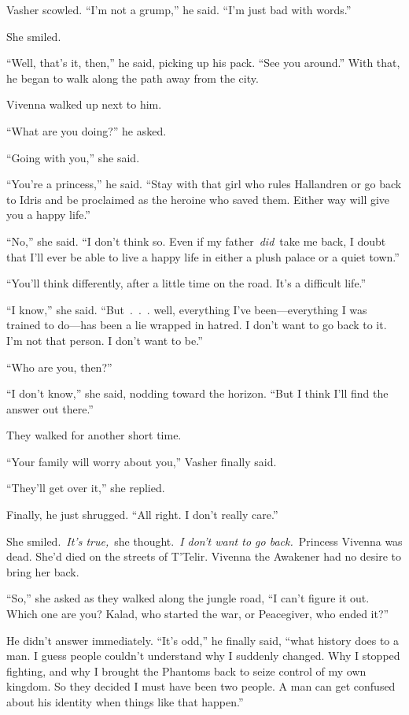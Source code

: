 Vasher scowled. “I’m not a grump,” he said. “I’m just bad with words.”

She smiled.

“Well, that’s it, then,” he said, picking up his pack. “See you around.” With that, he began to walk along the path away from the city.

Vivenna walked up next to him.

“What are you doing?” he asked.

“Going with you,” she said.

“You’re a princess,” he said. “Stay with that girl who rules Hallandren or go back to Idris and be proclaimed as the heroine who saved them. Either way will give you a happy life.”

“No,” she said. “I don’t think so. Even if my father~\textit{did}~take me back, I doubt that I’ll ever be able to live a happy life in either a plush palace or a quiet town.”

“You’ll think differently, after a little time on the road. It’s a difficult life.”

“I know,” she said. “But~.~.~. well, everything I’ve been—everything I was trained to do—has been a lie wrapped in hatred. I don’t want to go back to it. I’m not that person. I don’t want to be.”

“Who are you, then?”

“I don’t know,” she said, nodding toward the horizon. “But I think I’ll find the answer out there.”

They walked for another short time.

“Your family will worry about you,” Vasher finally said.

“They’ll get over it,” she replied.

Finally, he just shrugged. “All right. I don’t really care.”

She smiled.~\textit{It’s true,}~she thought.~\textit{I don’t want to go back.}~Princess Vivenna was dead. She’d died on the streets of T’Telir. Vivenna the Awakener had no desire to bring her back.

“So,” she asked as they walked along the jungle road, “I can’t figure it out. Which one are you? Kalad, who started the war, or Peacegiver, who ended it?”

He didn’t answer immediately. “It’s odd,” he finally said, “what history does to a man. I guess people couldn’t understand why I suddenly changed. Why I stopped fighting, and why I brought the Phantoms back to seize control of my own kingdom. So they decided I must have been two people. A man can get confused about his identity when things like that happen.”

